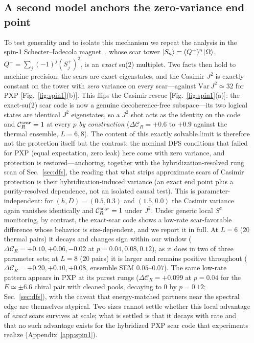 \documentclass[aps,prb,twocolumn]{revtex4-2}
\newcommand{\CR}{\mathcal{C}_R}
\begin{document}
\subsection{A second model anchors the zero-variance end point}
\label{sec:spin1}
To test generality and to isolate this mechanism we repeat the analysis in the
spin-1 Schecter--Iadecola magnet~\cite{Schecter2019}, whose scar tower
$\ket{S_n}=(Q^+)^n\ket{\Omega}$, $Q^+=\sum_j(-1)^j(S_j^+)^2$, is an \emph{exact}
su(2) multiplet. Two facts then hold to machine precision: the scars are exact
eigenstates, and the Casimir $J^2$ is exactly constant on the tower with
\emph{zero} variance on every scar---against $\mathrm{Var}\,J^2\simeq32$ for PXP
[Fig.~\ref{fig:spin1}(b)]. This flips the Casimir rescue
[Fig.~\ref{fig:spin1}(a)]: the exact-su(2) scar code is now a genuine
decoherence-free subspace---its two logical states are identical $J^2$
eigenstates, so a $J^2$ shot acts as the identity on the code and
$\CR^{\rm scar}=1$ at every $p$ \emph{by construction}
($\Delta\CR=+0.6$ to $+0.9$ against the thermal ensemble, $L=6,8$). The
content of this exactly solvable limit is therefore not the protection
itself but the contrast: the nominal DFS conditions that failed for PXP
(equal expectation, zero leak) here come with zero variance, and protection
is restored---anchoring, together with the hybridization-resolved rung scan
of Sec.~\ref{sec:dfs}, the reading that what strips approximate scars of
Casimir protection is their hybridization-induced variance (an exact end
point plus a purity-resolved dependence, not an isolated causal test). This is parameter-independent: for $(h,D)=(0.5,0.3)$ and
$(1.5,0.0)$ the Casimir variance again vanishes identically and $\CR^{\rm
scar}=1$ under $J^2$. Under generic local $S^z$ monitoring, by contrast, the
exact-scar code shows a low-rate scar-favorable difference whose behavior is
size-dependent, and we report it in full. At $L=6$ ($20$ thermal pairs) it
decays and changes sign within our window
($\Delta\CR=+0.10,+0.06,-0.02$ at $p=0.04,0.08,0.12$), as it does in two of
three parameter sets; at $L=8$ ($20$ pairs) it is larger and remains positive
throughout ($\Delta\CR=+0.20,+0.10,+0.08$, ensemble SEM $0.05$--$0.07$).
The same low-rate pattern appears in PXP at its purest rungs
($\Delta\CR=+0.099$ at $p=0.04$ for the $E\simeq\pm6.6$ chiral pair with
cleaned pools, decaying to $0$ by $p=0.12$; Sec.~\ref{sec:dfs}), with the caveat that
energy-matched partners near the spectral edge are themselves atypical. Two
sizes cannot settle whether this local advantage of \emph{exact} scars
survives at scale; what is settled is that it decays with rate and that no
such advantage exists for the hybridized PXP scar code that experiments
realize (Appendix~\ref{app:spin1}).
\end{document}
